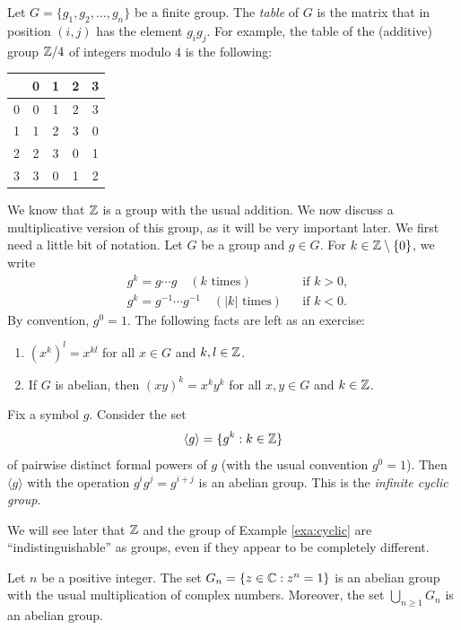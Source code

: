 \label{multiplication_table}
Let $G=\{g_1,g_2,\dots,g_n\}$ be a finite group. The \emph{table} 
of $G$ is the matrix 
that in position $(i,j)$ has the element $g_ig_j$. 
For example, the table of 
the (additive) group  
$\mathbb{Z}/4$ of integers modulo 4 is the following:
\begin{center}
  \begin{tabular}{l|cccc}
     &0&1&2&3 \\
    \hline
    0 & 0 & 1 & 2 & 3\\
    1 & 1 & 2 & 3 & 0\\
    2 & 2 & 3 & 0 & 1\\
    3 & 3 & 0 & 1 & 2
  \end{tabular}
\end{center}

We know that $\mathbb{Z}$ is a group with the usual addition. 
We now discuss a multiplicative version of this group, as it will be
very important later. We first need a little bit of notation. 
Let $G$ be a group and $g\in G$. For $k\in\mathbb{Z}\setminus\{0\}$, we write 
\begin{align*}
    & g^k=g\cdots g\quad (k\text{ times}) && \text{if $k>0$},\\
    & g^k=g^{-1}\cdots g^{-1}\quad (|k|\text{ times}) && \text{if $k<0$}.
\end{align*}
By convention, $g^0=1$.
The following facts are left as an exercise: 
\begin{enumerate}
    \item $(x^k)^l=x^{kl}$ for all $x\in G$ and $k,l\in\mathbb{Z}$.
    \item If $G$ is abelian, then $(xy)^k=x^ky^k$ for all $x,y\in G$ and $k\in\mathbb{Z}$.
\end{enumerate}

\begin{example}
\label{exa:cyclic}
Fix a symbol $g$. Consider the set  
\[
\langle g\rangle=\{g^k:k\in\mathbb{Z}\}
\]
of pairwise distinct formal powers of $g$
(with the usual convention $g^0=1$). Then
$\langle g\rangle$
with the operation $g^ig^j=g^{i+j}$ is an abelian group. This is the
\emph{infinite cyclic group}.
\end{example}

We will see later that $\mathbb{Z}$ and the group of 
Example \ref{exa:cyclic} are ``indistinguishable'' 
as groups, even if they appear to be completely different. 

\begin{example}
Let $n$ be a positive integer. The set 
$G_n=\{z\in\mathbb{C}:z^n=1\}$ is an abelian group with
the usual multiplication of complex numbers. Moreover, the set 
$\bigcup_{n\geq1}G_n$ is an abelian group. 
\end{example}

